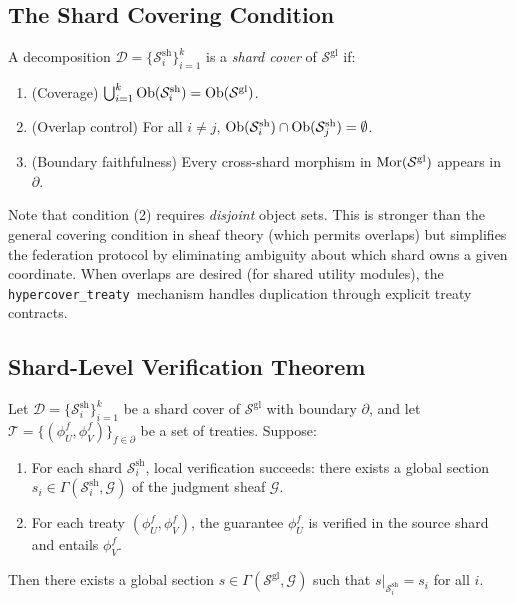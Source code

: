 \documentclass[11pt]{article}
\newcommand{\ShardSite}{\mathcal{S}^{\mathrm{sh}}}
\newcommand{\GlobalSite}{\mathcal{S}^{\mathrm{gl}}}
\newcommand{\HypercoverTreaty}{\texttt{hypercover\_treaty}}
\begin{document}
\subsection{The Shard Covering Condition}

\begin{definition}\label{def:shard-cover}
A decomposition $\mathcal{D} = \{\ShardSite_i\}_{i=1}^k$ is a
\emph{shard cover} of $\GlobalSite$ if:
\begin{enumerate}[noitemsep]
  \item (Coverage) $\bigcup_{i=1}^k \Ob(\ShardSite_i) =
        \Ob(\GlobalSite)$.
  \item (Overlap control) For all $i \neq j$, $\Ob(\ShardSite_i)
        \cap \Ob(\ShardSite_j) = \emptyset$.
  \item (Boundary faithfulness) Every cross-shard morphism in
        $\Mor(\GlobalSite)$ appears in $\partial$.
\end{enumerate}
\end{definition}

Note that condition (2) requires \emph{disjoint} object sets.  This
is stronger than the general covering condition in sheaf theory (which
permits overlaps) but simplifies the federation protocol by eliminating
ambiguity about which shard owns a given coordinate.  When overlaps
are desired (\eg for shared utility modules), the
\HypercoverTreaty\ mechanism handles duplication through explicit
treaty contracts.

\subsection{Shard-Level Verification Theorem}

\begin{theorem}\label{thm:shard-completeness}
Let $\mathcal{D} = \{\ShardSite_i\}_{i=1}^k$ be a shard cover of
$\GlobalSite$ with boundary $\partial$, and let $\mathcal{T} =
\{(\phi_U^f, \phi_V^f)\}_{f \in \partial}$ be a set of treaties.
Suppose:
\begin{enumerate}[noitemsep]
  \item For each shard $\ShardSite_i$, local verification succeeds:
        there exists a global section $s_i \in
        \Gamma(\ShardSite_i, \mathcal{G})$ of the judgment sheaf
        $\mathcal{G}$.
  \item For each treaty $(\phi_U^f, \phi_V^f)$, the guarantee
        $\phi_U^f$ is verified in the source shard and entails
        $\phi_V^f$.
\end{enumerate}
Then there exists a global section $s \in
\Gamma(\GlobalSite, \mathcal{G})$ such that $s|_{\ShardSite_i} = s_i$
for all $i$.
\end{theorem}
\end{document}
